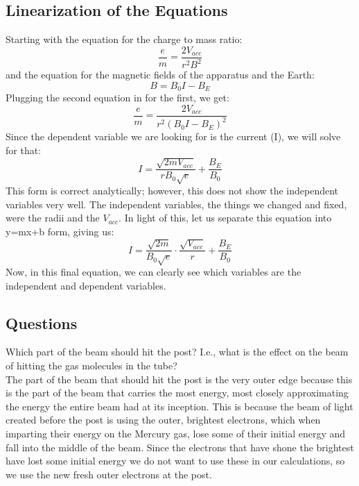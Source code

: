 \documentclass[aps,prl,10pt,twocolumn,floatfix]{revtex4-2}
\begin{document}
\subsection{Linearization of the Equations}
Starting with the equation for the charge to mass ratio:
\begin{equation}
\frac{e}{m}=\frac{2V_{acc}}{r^2B^2}
\end{equation}
and the equation for the magnetic fields of the apparatus and the Earth:
\begin{equation}
B=B_0I-B_E
\end{equation}
Plugging the second equation in for the first, we get:
\begin{equation*}
\frac{e}{m}=\frac{2V_{acc}}{r^2(B_0I-B_E)^2}
\end{equation*}
Since the dependent variable we are looking for is the current (I), we will solve for that:
\begin{equation*}
I=\frac{\sqrt{2mV_{acc}}}{rB_0\sqrt{e}}+\frac{B_E}{B_0}
\end{equation*}
This form is correct analytically;
however, this does not show the independent variables very well.
The independent variables, the things we changed and fixed, were the radii and the $V_{acc}$.
In light of this, let us separate this equation into y=mx+b form, giving us:
\begin{equation}
I=\frac{\sqrt{2m}}{B_0\sqrt{e}}\cdot \frac{\sqrt{V_{acc}}}{r}+\frac{B_E}{B_0}
\end{equation}
Now, in this final equation, we can clearly see which variables are the independent and dependent variables.
\subsection{Questions}
Which part of the beam should hit the post? I.e., what is the effect on the beam of hitting the gas
molecules in the tube?\\
The part of the beam that should hit the post is the very outer edge because this is the part of the beam that carries the most energy, most closely approximating the energy the entire beam had at its inception.
This is because the beam of light created before the post is using the outer, brightest electrons, which when imparting their energy on the Mercury gas, lose some of their initial energy and fall into the middle of the beam.
Since the electrons that have shone the brightest have lost some initial energy we do not want to use these in our calculations, so we use the new fresh outer electrons at the post.
\end{document}
